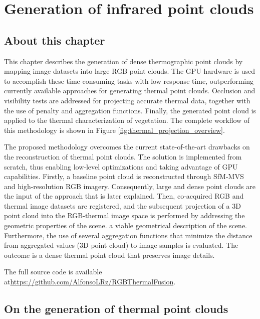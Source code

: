 \setchapterpreamble[u]{\margintoc}
\chapter{Generation of infrared point clouds}
\label{sec:thermal_pc}

\section*{About this chapter}

This chapter describes the generation of dense thermographic point clouds by mapping image datasets into large RGB point clouds. The GPU hardware is used to accomplish these time-consuming tasks with low response time, outperforming currently available approaches for generating thermal point clouds. Occlusion and visibility tests are addressed for projecting accurate thermal data, together with the use of penalty and aggregation functions. Finally, the generated point cloud is applied to the thermal characterization of vegetation. The complete workflow of this methodology is shown in Figure \ref{fig:thermal_projection_overview}.

The proposed methodology overcomes the current state-of-the-art drawbacks on the reconstruction of thermal point clouds. The solution is implemented from scratch, thus enabling low-level optimizations and taking advantage of GPU capabilities. Firstly, a baseline point cloud is reconstructed through SfM-MVS and high-resolution RGB imagery. Consequently, large and dense point clouds are the input of the approach that is later explained. Then, co-acquired RGB and thermal image datasets are registered, and the subsequent projection of a 3D point cloud into the RGB-thermal image space is performed by addressing the geometric properties of the scene. a viable geometrical description of the scene. Furthermore, the use of several aggregation functions that minimize the distance from aggregated values (3D point cloud) to image samples is evaluated. The outcome is a dense thermal point cloud that preserves image details.

The full source code is available at\newline \url{https://github.com/AlfonsoLRz/RGBThermalFusion}.

\section{On the generation of thermal point clouds}

